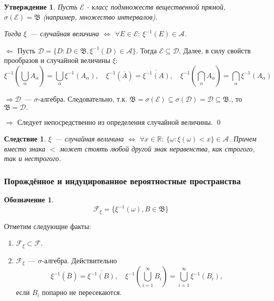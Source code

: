 \documentclass[oneside,final,14pt]{extreport}
\renewenvironment{proof}{{\bfseries Доказательство.}}{\qed}
\theoremstyle{plain}
\newtheorem*{thm*}{Утверждение}
\newtheorem*{crlr}{Следствие}
\theoremstyle{definition}
\newtheorem*{symb}{Обозначение}
\theoremstyle{named}
\begin{document}
\begin{thm*}
    Пусть $\mathcal{E}$ - класс подмножеств вещественной прямой, $\sigma(\mathcal{E}) = \mathfrak{B}$ (например, множество интервалов).

    Тогда $\xi$~--- случайная величина $\Leftrightarrow$ $\forall E \in \mathcal{E}: ~\xi^{-1}(E) \in \mathcal{A}$.
\end{thm*}

\begin{proof}
    $\boxed{\Leftarrow}$ Пусть $\mathcal{D} = \{D : D \in \mathfrak{B}, \xi^{-1}(D) \in \mathcal{A} \}$. Тогда $\mathcal{E} \subseteq \mathcal{D}$. Далее, в силу свойств прообразов и случайной величины $\xi$:
    \begin{equation*}
        \xi^{-1}\left(\bigcup\limits_\alpha A_\alpha\right) = \bigcup\limits_\alpha \xi^{-1}(A_\alpha), \quad
        \xi^{-1}(\overline{A}) = \overline{\xi^{-1}(A)}, \quad
        \xi^{-1}\left(\bigcap\limits_\alpha A_\alpha\right) = \bigcap\limits_\alpha \xi^{-1}(A_\alpha)
    \end{equation*}

    $ \Rightarrow \mathcal{D}$~--- $\sigma$-алгебра. Следовательно, т.к. $\mathfrak{B} = \sigma(\mathcal{E}) \subseteq \sigma(\mathcal{D}) = \mathcal{D} \subseteq \mathfrak{B}.$, то $\mathfrak{B} = \mathcal{D}.$
    
    $\boxed{\Rightarrow}$ Следует непосредственно из определения случайной величины.
\end{proof}

\begin{crlr}
    $\xi$~--- случайная величина $\Leftrightarrow$ $\forall x \in \mathbb{R}:~ \{\omega : \xi(\omega) < x \} \in \mathcal{A}$. Причем вместо знака $<$ может стоять любой другой знак неравенства, как строгого, так и нестрогого.
\end{crlr}

\subsubsection{Порождённое и индуцированное вероятностные пространства}
\begin{symb}
    \begin{equation*}
        \mathcal{F}_\xi = \{ \xi^{-1}(\omega), B \in \mathfrak{B} \}
    \end{equation*}
\end{symb}

Отметим следующие факты:
\begin{enumerate}
    \item $\mathcal{F}_\xi \subset \mathcal{F}.$
    \item $\mathcal{F}_\xi$~--- $\sigma$-алгебра. Действительно
    \begin{equation*}
        \xi^{-1}(\overline{B}) = \overline{\xi^{-1}(B)}, \quad
        \xi^{-1}\left(\bigcup\limits_{i=1}^{\infty}B_i\right) = \bigcup\limits_{i=1}^\infty \xi^{-1}(B_i),
    \end{equation*}
   если $B_i$ попарно не пересекаются.
\end{enumerate}
\end{document}
